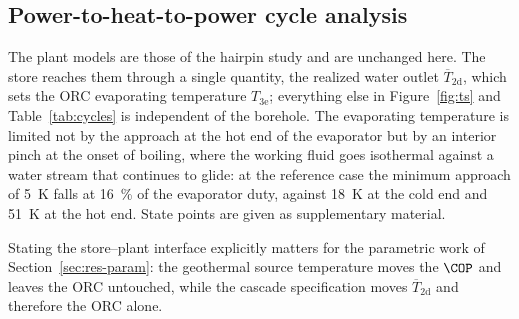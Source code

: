 %
%
%
\subsection{Power-to-heat-to-power cycle analysis}
\label{sec:res-cycles}

The plant models are those of the hairpin study and are unchanged here. The
store reaches them through a single quantity, the realized water outlet
$\overline{T}_\mathrm{2d}$, which sets the ORC evaporating temperature
$T_\mathrm{3e}$; everything else in Figure~\ref{fig:ts} and
Table~\ref{tab:cycles} is independent of the borehole. The evaporating
temperature is limited not by the approach at the hot end of the evaporator
but by an interior pinch at the onset of boiling, where the working fluid
goes isothermal against a water stream that continues to glide: at the
reference case the minimum approach of \SI{5}{\kelvin} falls at
\SI{16}{\percent} of the evaporator duty, against \SI{18}{\kelvin} at the
cold end and \SI{51}{\kelvin} at the hot end. State points are given as
supplementary material.

Stating the store--plant interface explicitly matters for the parametric
work of Section~\ref{sec:res-param}: the geothermal source temperature moves
the $\COP$ and leaves the ORC untouched, while the cascade specification
moves $\overline{T}_\mathrm{2d}$ and therefore the ORC alone.


